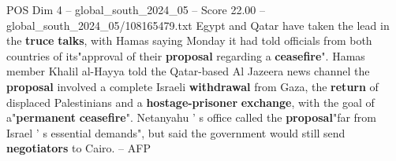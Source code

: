 \begin{textsample}{POS Dim 4 – global\_south\_2024\_05 – Score 22.00 – global\_south\_2024\_05/108165479.txt}
Egypt and Qatar have taken the lead in the \textbf{truce} \textbf{talks}, with Hamas saying Monday it had told officials from both countries of its"approval of their \textbf{proposal} regarding a \textbf{ceasefire}".
Hamas member Khalil al-Hayya told the Qatar-based Al Jazeera news channel the \textbf{proposal} involved a complete Israeli \textbf{withdrawal} from Gaza, the \textbf{return} of displaced Palestinians and a \textbf{hostage-prisoner} \textbf{exchange}, with the goal of a"\textbf{permanent} \textbf{ceasefire}".
Netanyahu ' s office called the \textbf{proposal}"far from Israel ' s essential demands", but said the government would still send \textbf{negotiators} to Cairo. -- AFP

\end{textsample}
